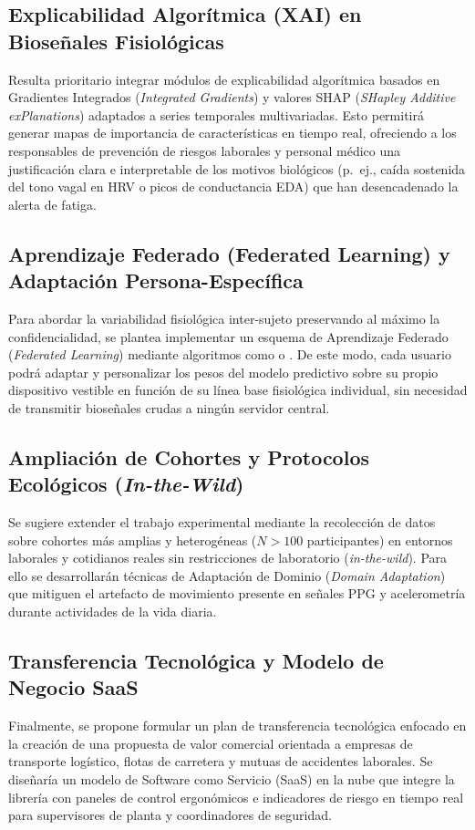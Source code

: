 \subsection{Explicabilidad Algorítmica (XAI) en Bioseñales Fisiológicas}
Resulta prioritario integrar módulos de explicabilidad algorítmica basados en Gradientes Integrados (\textit{Integrated Gradients}) y valores SHAP (\textit{SHapley Additive exPlanations}) adaptados a series temporales multivariadas. Esto permitirá generar mapas de importancia de características en tiempo real, ofreciendo a los responsables de prevención de riesgos laborales y personal médico una justificación clara e interpretable de los motivos biológicos (p.~ej., caída sostenida del tono vagal en HRV o picos de conductancia EDA) que han desencadenado la alerta de fatiga.

\subsection{Aprendizaje Federado (Federated Learning) y Adaptación Persona-Específica}
Para abordar la variabilidad fisiológica inter-sujeto preservando al máximo la confidencialidad, se plantea implementar un esquema de Aprendizaje Federado (\textit{Federated Learning}) mediante algoritmos como  o . De este modo, cada usuario podrá adaptar y personalizar los pesos del modelo predictivo sobre su propio dispositivo vestible en función de su línea base fisiológica individual, sin necesidad de transmitir bioseñales crudas a ningún servidor central.

\subsection{Ampliación de Cohortes y Protocolos Ecológicos (\textit{In-the-Wild})}
Se sugiere extender el trabajo experimental mediante la recolección de datos sobre cohortes más amplias y heterogéneas ($N > 100$ participantes) en entornos laborales y cotidianos reales sin restricciones de laboratorio (\textit{in-the-wild}). Para ello se desarrollarán técnicas de Adaptación de Dominio (\textit{Domain Adaptation}) que mitiguen el artefacto de movimiento presente en señales PPG y acelerometría durante actividades de la vida diaria.

\subsection{Transferencia Tecnológica y Modelo de Negocio SaaS}
Finalmente, se propone formular un plan de transferencia tecnológica enfocado en la creación de una propuesta de valor comercial orientada a empresas de transporte logístico, flotas de carretera y mutuas de accidentes laborales. Se diseñaría un modelo de Software como Servicio (SaaS) en la nube que integre la librería  con paneles de control ergonómicos e indicadores de riesgo en tiempo real para supervisores de planta y coordinadores de seguridad.
